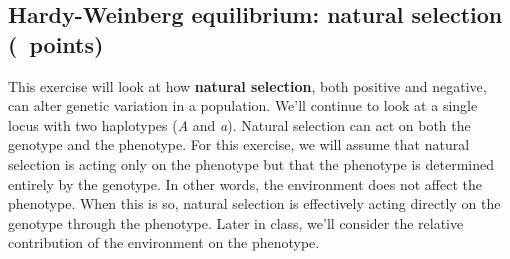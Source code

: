 \documentclass[11pt, addpoints]{exam}
\begin{document}
\subsection*{Hardy-Weinberg equilibrium: natural selection (\numpoints\ points)}

This exercise will look at how \textbf{natural selection}, both positive
and negative, can alter genetic variation in a population. We'll
continue to look at a single locus with two haplotypes (\emph{A} and
\emph{a}). Natural selection can act on both the genotype and the
phenotype. For this exercise, we will assume that natural selection is
acting only on the phenotype but that the phenotype is determined
entirely by the genotype. In other words, the environment does not
affect the phenotype. When this is so, natural selection is effectively
acting directly on the genotype through the phenotype. Later in class,
we'll consider the relative contribution of the environment on the
phenotype.
\end{document}

